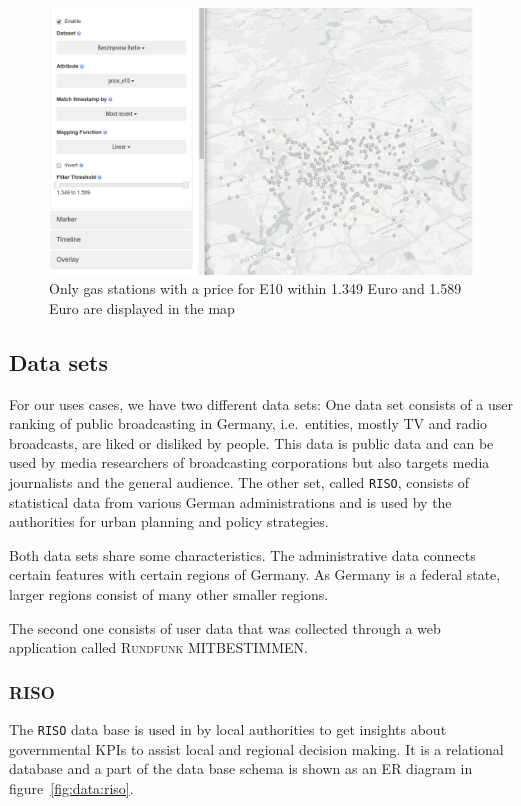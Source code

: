 \documentclass{article}
\newcommand{\rufu}{\textsc{Rundfunk MITBESTIMMEN}}
\newcommand{\riso}{\texttt{RISO}}
\begin{document}
\begin{figure}[h!]
  \centering
  \includegraphics[width=\textwidth]{images/existing-interactions-filter.png}
  \caption{ Only gas stations with a price for E10 within 1.349 Euro and 1.589 Euro are displayed in the map}
  \label{fig:analysis:interaction:existing:filter}
\end{figure}


\subsection{Data sets}
For our uses cases, we have two different data sets:
One data set consists of a user ranking of public broadcasting in Germany, i.e.\ entities, mostly TV and radio broadcasts, are liked or disliked by people.
This data is public data and can be used by media researchers of broadcasting corporations but also targets media journalists and the general audience.
The other set, called \riso{}, consists of statistical data from various German administrations and is used by the authorities for urban planning and policy strategies.

Both data sets share some characteristics.
The administrative data connects certain features with certain regions of Germany.
As Germany is a federal state, larger regions consist of many other smaller regions.

The second one consists of user data that was collected through a web application called \rufu{}.

\subsubsection{RISO}

The \riso{} data base is used in by local authorities to get insights about governmental KPIs to assist local and regional decision making.
It is a relational database and a part of the data base schema is shown as an ER diagram in figure~\ref{fig:data:riso}.
\end{document}
